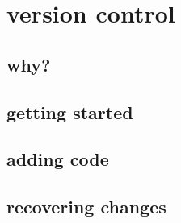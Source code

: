 \documentclass[hyperref={pdfpagelabels=false}]{beamer}
\begin{document}
\section{version control}
\subsection{why?}
\subsection{getting started}
\subsection{adding code}
\subsection{recovering changes}
\end{document}
